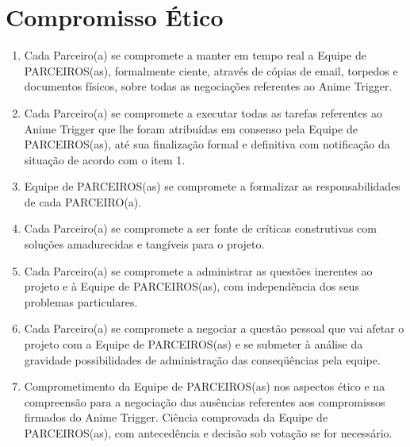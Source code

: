\documentclass[article]{abntex2}
\begin{document}
\section*{Compromisso Ético}
\begin{enumerate}
	\item{Cada Parceiro(a) se compromete a manter em tempo real a Equipe de PARCEIROS(as), formalmente ciente, através de cópias de email, torpedos e documentos físicos, sobre todas as negociações referentes ao Anime Trigger.}
	\item{Cada Parceiro(a) se compromete a executar todas as tarefas referentes ao Anime Trigger que lhe foram atribuídas em consenso pela Equipe de PARCEIROS(as), até sua finalização formal e definitiva com notificação da situação de acordo com o item 1.}
	\item{Equipe de PARCEIROS(as) se compromete a formalizar as responsabilidades de cada PARCEIRO(a).}
	\item{Cada Parceiro(a) se compromete a ser fonte de críticas construtivas com soluções amadurecidas e tangíveis para o projeto.}
	\item{Cada Parceiro(a) se compromete a administrar as questões inerentes ao projeto e à Equipe de PARCEIROS(as), com independência dos seus problemas particulares.}
	\item{Cada Parceiro(a) se compromete a negociar a questão pessoal que vai afetar o projeto com a Equipe de PARCEIROS(as) e se submeter à análise da gravidade possibilidades de administração das conseqüências pela equipe.}
	\item{Comprometimento da Equipe de PARCEIROS(as) nos aspectos ético e na compreensão para a negociação das ausências referentes aos compromissos firmados do Anime Trigger. Ciência comprovada da Equipe de PARCEIROS(as), com antecedência e decisão sob votação se for necessário.}
\end{enumerate}
\end{document}
